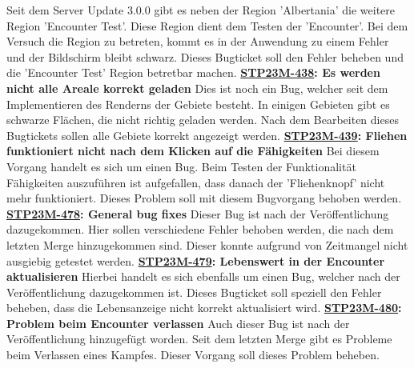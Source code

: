 Seit dem Server Update 3.0.0 gibt es neben der Region 'Albertania' die weitere Region 'Encounter Test'. Diese Region dient dem Testen der 'Encounter'. Bei dem Versuch die Region zu betreten, kommt es in der Anwendung zu einem Fehler und der Bildschirm bleibt schwarz. Dieses Bugticket soll den Fehler beheben und die 'Encounter Test' Region betretbar machen.
\newline
\newline
\textbf{\hyperlink{T438}{\hypertarget{S438}{STP23M-438}}: Es werden nicht alle Areale korrekt geladen}
\newline
\newline
Dies ist noch ein Bug, welcher seit dem Implementieren des Renderns der Gebiete besteht. In einigen Gebieten gibt es schwarze Flächen, die nicht richtig geladen werden. Nach dem Bearbeiten dieses Bugtickets sollen alle Gebiete korrekt angezeigt werden.
\newline
\newline
\textbf{\hyperlink{T439}{\hypertarget{S439}{STP23M-439}}: Fliehen funktioniert nicht nach dem Klicken auf die Fähigkeiten}
\newline
\newline
Bei diesem Vorgang handelt es sich um einen Bug. Beim Testen der Funktionalität Fähigkeiten auszuführen ist aufgefallen, dass danach der 'Fliehenknopf' nicht mehr funktioniert. Dieses Problem soll mit diesem Bugvorgang behoben werden.
\newline
\newline
\textbf{\hyperlink{T478}{\hypertarget{S478}{STP23M-478}}: General bug fixes}
\newline
\newline
Dieser Bug ist nach der Veröffentlichung dazugekommen. Hier sollen verschiedene Fehler behoben werden, die nach dem letzten Merge hinzugekommen sind. Dieser konnte aufgrund von Zeitmangel nicht ausgiebig getestet werden.
\newline
\newline
\textbf{\hyperlink{T479}{\hypertarget{S479}{STP23M-479}}: Lebenswert in der Encounter aktualisieren}
\newline
\newline
Hierbei handelt es sich ebenfalls um einen Bug, welcher nach der Veröffentlichung dazugekommen ist. Dieses Bugticket soll speziell den Fehler beheben, dass die Lebensanzeige nicht korrekt aktualisiert wird.
\newline
\newline
\textbf{\hyperlink{T480}{\hypertarget{480}{STP23M-480}}: Problem beim Encounter verlassen}
\newline
\newline
Auch dieser Bug ist nach der Veröffentlichung hinzugefügt worden. Seit dem letzten Merge gibt es Probleme beim Verlassen eines Kampfes. Dieser Vorgang soll dieses Problem beheben.
